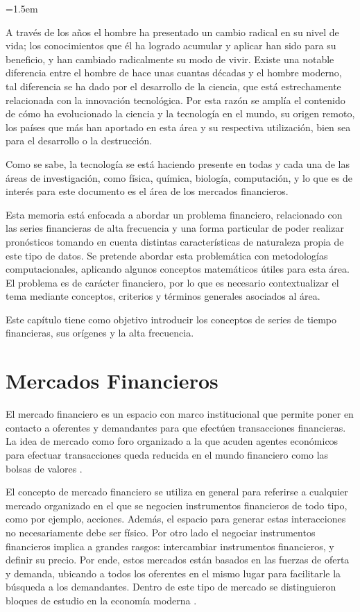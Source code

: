 \parindent=1.5em

A través de los años el hombre ha presentado un cambio radical en su nivel de vida; los conocimientos que él ha logrado acumular y aplicar han sido para su beneficio,
y han cambiado radicalmente su modo de vivir. Existe una notable diferencia entre el hombre de hace unas cuantas décadas y el hombre moderno, tal diferencia se ha
dado por el desarrollo de la ciencia, que está estrechamente relacionada con la innovación tecnológica. Por esta razón se amplía el contenido de cómo ha
evolucionado la ciencia y la tecnología en el mundo, su origen remoto, los países que más han aportado en esta área y su respectiva utilización, bien sea para
el desarrollo o la destrucción.

Como se sabe, la tecnología se está haciendo presente en todas y cada una de las áreas de investigación, como física, química, biología, computación, y lo que es de
interés para este documento es el área de los mercados financieros.

Esta memoria está enfocada a abordar un problema financiero, relacionado con las series financieras de alta frecuencia y una forma particular
de poder realizar pronósticos tomando en cuenta distintas características de naturaleza propia de este tipo de datos. 
Se pretende abordar esta problemática con metodologías computacionales, aplicando algunos conceptos matemáticos
útiles para esta área. El problema es de carácter financiero, por lo que es necesario contextualizar el tema mediante conceptos, criterios 
y términos generales asociados al área.

Este capítulo tiene como objetivo introducir los conceptos de series de tiempo financieras, sus orígenes y la alta frecuencia.

\section{Mercados Financieros}

El mercado financiero es un espacio con marco institucional que permite poner en contacto a oferentes y demandantes para que efectúen
transacciones financieras. La idea de mercado como foro organizado a la que acuden agentes económicos para efectuar transacciones
queda reducida en el mundo financiero como las bolsas de valores \cite{mishkin2006financial}.

El concepto de mercado financiero se utiliza en general para referirse a cualquier mercado organizado en el que se negocien instrumentos financieros
de todo tipo, como por ejemplo, acciones. Además, el espacio para generar estas interacciones no necesariamente debe ser físico. Por otro lado el negociar
instrumentos financieros implica a grandes rasgos: intercambiar instrumentos financieros, y definir su precio. Por ende, estos mercados están basados en
las fuerzas de oferta y demanda, ubicando a todos los oferentes en el mismo lugar para facilitarle la búsqueda a los demandantes. Dentro
de este tipo de mercado se distinguieron bloques de estudio en la economía moderna \cite{jensen1984theory}.

